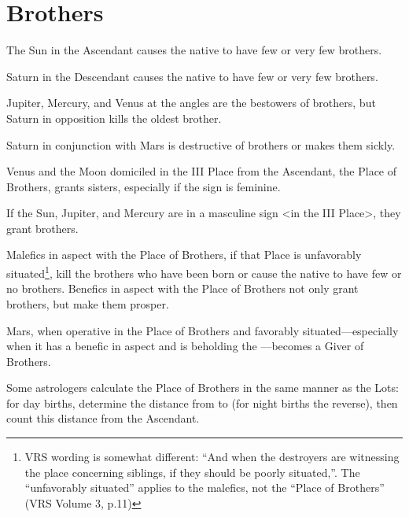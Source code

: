 \section{Brothers}

The Sun in the Ascendant causes the native to have few or very few brothers. 

Saturn in the Descendant causes the native to have few or very few brothers. 

Jupiter, Mercury, and Venus at the angles are the bestowers of brothers, but Saturn in opposition kills the oldest brother. 

Saturn in conjunction with Mars is destructive of brothers or makes them sickly. 

Venus and the Moon domiciled in the III Place from the Ascendant, the Place of Brothers, grants sisters, especially if the sign is feminine. 

If the Sun, Jupiter, and Mercury are in a masculine sign <in the III Place>, they grant brothers. 

Malefics in aspect with the Place of Brothers, if that Place is unfavorably situated\footnote{VRS wording is somewhat different: ``And when the destroyers are witnessing the place concerning siblings, if they should be poorly situated,''. The ``unfavorably situated'' applies to the malefics, not the ``Place of Brothers'' (VRS Volume 3, p.11)}, kill the brothers who have been born or cause the native to have few or no brothers. Benefics in aspect with the Place of Brothers not only grant brothers, but make them prosper. 

Mars, when operative in the Place of Brothers and favorably situated—especially when it has a benefic in aspect and is beholding the \Moon—becomes a Giver of Brothers.

Some astrologers calculate the Place of Brothers in the same manner as the Lots: for day births, determine the distance from \Saturn\xspace to \Jupiter\xspace (for night births the reverse), then count this distance from the Ascendant.

\newpage
